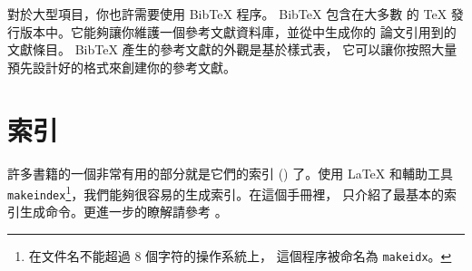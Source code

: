 
對於大型項目，你也許需要使用 Bib\TeX{} 程序。 Bib\TeX{} 包含在大多數
的 \TeX{} 發行版本中。它能夠讓你維護一個參考文獻資料庫，並從中生成你的
論文引用到的文獻條目。 Bib\TeX{} 產生的參考文獻的外觀是基於樣式表，
它可以讓你按照大量預先設計好的格式來創建你的參考文獻。



\section{索引}\label{sec:indexing}


許多書籍的一個非常有用的部分就是它們的索引 () 了。使用 \LaTeX{} 和輔助工具
 \texttt{makeindex}\footnote{在文件名不能超過 8 個字符的操作系統上，
這個程序被命名為 \texttt{makeidx}。}，我們能夠很容易的生成索引。在這個手冊裡，
只介紹了最基本的索引生成命令。更進一步的瞭解請參考 \companion。
 


